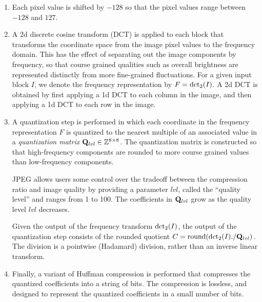 \begin{enumerate}

\item Each pixel value is shifted by $-128$ so that the pixel
   values range between $-128$ and $127$.

\item A 2d discrete cosine transform (DCT) is applied to each block
    that transforms the coordinate space from the image pixel values to
    the frequency domain.  This has the effect of separating out the
    image components by frequency, so that course grained qualities
    such as overall brightness are represented distinctly from more
    fine-grained fluctuations.  For a given input block
    $I$, we denote the frequency representation by $F = \mathrm{dct}_2(I)$.
    A 2d DCT is obtained by first applying a 1d DCT to each
    column in the image, and then applying a 1d DCT to each row
    in the image.

\item A quantization step is performed in which each coordinate in
    the frequency representation $F$ is quantized to the nearest multiple of an
    associated value in a \emph{quantization matrix}
    $\mathbf{Q}_{lvl} \in \mathbb{Z}^{8\times{}8}$. The quantization matrix is
    constructed so that high-frequency components are rounded to more
    course grained values than low-frequency components.


    JPEG allows users some control over the tradeoff between the
    compression ratio and image quality by providing a parameter $lvl$,
    called the ``quality level'' and ranges from 1 to 100. The
    coefficients in $\mathbf{Q}_{lvl}$ grow as the quality level
    $lvl$ decreases.

    Given the output of the frequency transform $\mathrm{dct}_2(I)$, the output
    of the quantization step consists of the rounded quotient
    $C = \mathrm{round}(\mathrm{dct}_2(I) ./ \mathbf{Q}_{lvl})$.  The division is a
    pointwise (Hadamard) division, rather than an inverse linear
    transform.

\item Finally, a variant of Huffman compression is performed that
    compresses the quantized coefficients into a string of bits.
    The compression is lossless, and designed to represent the
    quantized coefficients in a small number of bits.

\end{enumerate}

